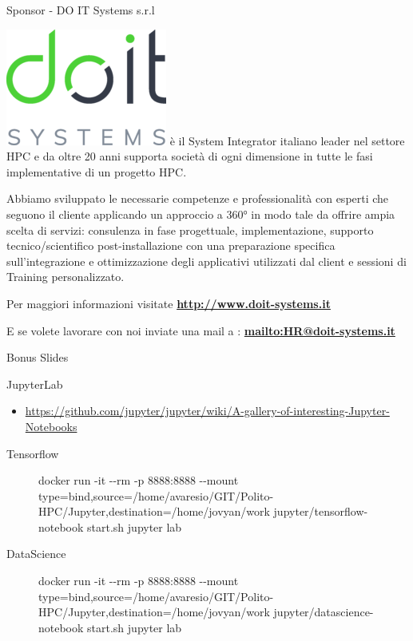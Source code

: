 \documentclass[ignorenonframetext,]{beamer}
\providecommand{\tightlist}{%
  \setlength{\itemsep}{0pt}\setlength{\parskip}{0pt}}
\begin{document}
\begin{frame}{Sponsor - DO IT Systems s.r.l}

\href{http://www.doit-systems.it}{\includegraphics{images/DoIT.png}} è
il System Integrator italiano leader nel settore HPC e da oltre 20 anni
supporta società di ogni dimensione in tutte le fasi implementative di
un progetto HPC.

Abbiamo sviluppato le necessarie competenze e professionalità con
esperti che seguono il cliente applicando un approccio a 360° in modo
tale da offrire ampia scelta di servizi: consulenza in fase progettuale,
implementazione, supporto tecnico/scientifico post-installazione con una
preparazione specifica sull'integrazione e ottimizzazione degli
applicativi utilizzati dal client e sessioni di Training personalizzato.

Per maggiori informazioni visitate
\textbf{\url{http://www.doit-systems.it}}

E se volete lavorare con noi inviate una mail a :
\textbf{\href{HR@doit-systems.it}{mailto:HR@doit-systems.it}}

\end{frame}

\begin{frame}{Bonus Slides}

\end{frame}

\begin{frame}{JupyterLab}

\begin{itemize}
\tightlist
\item
  \url{https://github.com/jupyter/jupyter/wiki/A-gallery-of-interesting-Jupyter-Notebooks}
\end{itemize}


\begin{description}
\item[Tensorflow]
docker run -it -\/-rm -p 8888:8888 -\/-mount
type=bind,source=/home/avaresio/GIT/Polito-HPC/Jupyter,destination=/home/jovyan/work
jupyter/tensorflow-notebook start.sh jupyter lab
\item[DataScience]
docker run -it -\/-rm -p 8888:8888 -\/-mount
type=bind,source=/home/avaresio/GIT/Polito-HPC/Jupyter,destination=/home/jovyan/work
jupyter/datascience-notebook start.sh jupyter lab
\end{description}


\end{frame}
\end{document}
